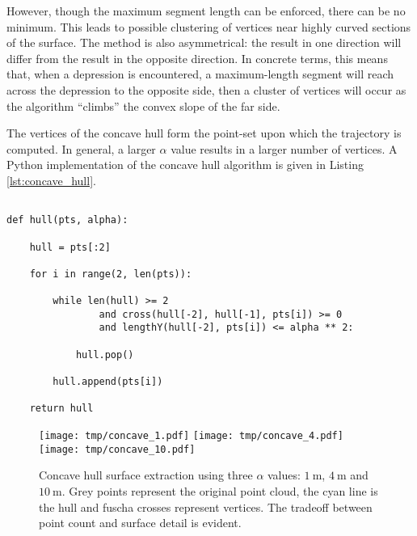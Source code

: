 \documentclass[doc]{apa6}
\begin{document}
However, though the maximum segment length can be enforced, there can be no minimum. This leads to possible clustering of vertices near highly curved sections of the surface. The method is also asymmetrical: the result in one direction will differ from the result in the opposite direction. In concrete terms, this means that, when a depression is encountered, a maximum-length segment will reach across the depression to the opposite side, then a cluster of vertices will occur as the algorithm ``climbs'' the convex slope of the far side.

The vertices of the concave hull form the point-set upon which the trajectory is computed. In general, a larger $\alpha$ value results in a larger number of vertices. A Python implementation of the concave hull algorithm is given in Listing \ref{lst:concave_hull}. 

\begin{listing}
\begin{verbatim}

def hull(pts, alpha):

	hull = pts[:2]

	for i in range(2, len(pts)):
	
		while len(hull) >= 2 
				and cross(hull[-2], hull[-1], pts[i]) >= 0 
				and lengthY(hull[-2], pts[i]) <= alpha ** 2:

			hull.pop()

		hull.append(pts[i])

	return hull

\end{verbatim}
\caption{Modified Monotone Chain algorithm for constructing a convex hull. The \lstinline{cross} function determines whether the segment makes a clockwise or counterclockwise turn; \lstinline{lengthY} gives the distance between points in $y$. The \lstinline{pts} array is a list of points, sorted on $y$; \lstinline{alpha} is the maximum segment length.}
\label{lst:concave_hull}
\end{listing}


\begin{figure} %
\texttt{[image: tmp/concave\_1.pdf]} 
\texttt{[image: tmp/concave\_4.pdf]} 
\texttt{[image: tmp/concave\_10.pdf]} 
\caption{Concave hull surface extraction using three $\alpha$ values: $\SI{1}\m$, $\SI{4}\m$ and $\SI{10}\m$. Grey points represent the original point cloud, the cyan line is the hull and fuscha crosses represent vertices. The tradeoff between point count and surface detail is evident.}
\label{fig:concave}
\end{figure}
\end{document}
